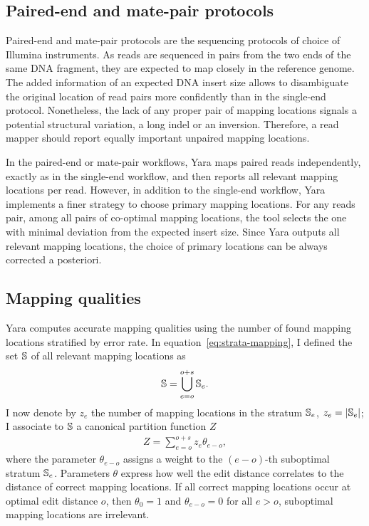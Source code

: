 

\subsection{Paired-end and mate-pair protocols}
\label{sec:yara:eng:pairs}
Paired-end and mate-pair protocols are the sequencing protocols of choice of Illumina instruments.
As reads are sequenced in pairs from the two ends of the same DNA fragment, they are expected to map closely in the reference genome.
The added information of an expected DNA insert size allows to disambiguate the original location of read pairs more confidently than in the single-end protocol.
Nonetheless, the lack of any proper pair of mapping locations signals a potential structural variation, \eg a long indel or an inversion.
Therefore, a read mapper should report equally important unpaired mapping locations.

In the paired-end or mate-pair workflows, Yara maps paired reads independently, exactly as in the single-end workflow, and then reports all relevant mapping locations per read.
However, in addition to the single-end workflow, Yara implements a finer strategy to choose primary mapping locations.
For any reads pair, among all pairs of co-optimal mapping locations, the tool selects the one with minimal deviation from the expected insert size.
Since Yara outputs all relevant mapping locations, the choice of primary locations can be always corrected a posteriori.

\subsection{Mapping qualities}
\label{sec:yara:eng:qualities}
Yara computes accurate mapping qualities using the number of found mapping locations stratified by error rate.
In equation~\ref{eq:strata-mapping}, I defined the set $\mathbb{S}$ of all relevant mapping locations as
\begin{eqnarray}
\mathbb{S} = \bigcup_{e=o}^{o+s} \mathbb{S}_e.
\end{eqnarray}
I now denote by $z_e$ the number of mapping locations in the stratum $\mathbb{S}_e$, \ie $z_e=|\mathbb{S}_e|$;
I associate to $\mathbb{S}$ a canonical partition function $Z$
\begin{eqnarray}
\label{eq:yara:mqual:partition}
Z = \sum_{e=o}^{o+s} z_e \theta_{e-o},
\end{eqnarray}
where the parameter $\theta_{e-o}$ assigns a weight to the $(e-o)$-th suboptimal stratum $\mathbb{S}_e$.
Parameters $\theta$ express how well the edit distance correlates to the distance of correct mapping locations.
If all correct mapping locations occur at optimal edit distance $o$, then $\theta_{0} = 1$ and $\theta_{e-o} = 0$ for all $e > o$, \ie suboptimal mapping locations are irrelevant.

